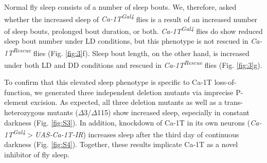 Normal fly sleep consists of a number of sleep bouts.
We, therefore, asked whether the increased sleep of \emph{Ca-\alpha1T\textsuperscript{Gal4}} flies is a result of an increased number of sleep bouts, prolonged bout duration, or both.
\emph{Ca-\alpha1T\textsuperscript{Gal4}} flies do show reduced sleep bout number under LD conditions, but this phenotype is not rescued in \emph{Ca-\alpha1T\textsuperscript{Rescue}} flies (Fig. \ref{fig:3}f).
Sleep bout length, on the other hand, is increased under both LD and DD conditions and rescued in \emph{Ca-\alpha1T\textsuperscript{Rescue}} flies (Fig. \ref{fig:3}g).

To confirm that this elevated sleep phenotype is specific to Ca-\alpha1T loss-of-function, we generated three independent deletion mutants via imprecise P-element excision.
As expected, all three deletion mutants as well as a trans-heterozygous mutants ($\Delta$3/$\Delta$115) show increased sleep, especially in constant darkness (Fig. \ref{fig:S3}).
In addition, knockdown of Ca-\alpha1T in its own neurons (\emph{Ca-\alpha1T\textsuperscript{Gal4}$>${}UAS-Ca-\alpha1T-IR}) increases sleep after the third day of continuous darkness (Fig. \ref{fig:S4}).
Together, these results implicate Ca-\alpha1T as a novel inhibitor of fly sleep.
  